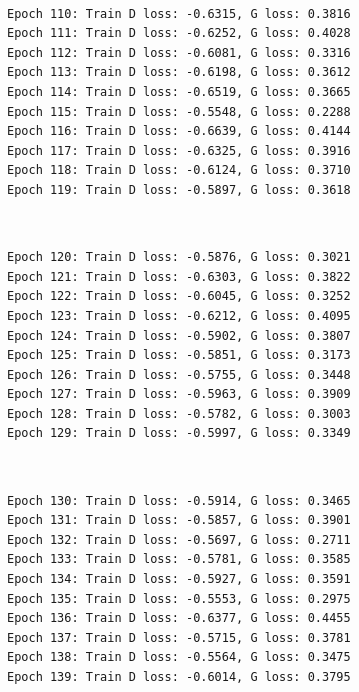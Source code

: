 \documentclass[11pt]{article}
\begin{document}
    \begin{center}
    \end{center}
    { \hspace*{\fill} \\}
    
    \begin{Verbatim}[commandchars=\\\{\}]
Epoch 110: Train D loss: -0.6315, G loss: 0.3816
Epoch 111: Train D loss: -0.6252, G loss: 0.4028
Epoch 112: Train D loss: -0.6081, G loss: 0.3316
Epoch 113: Train D loss: -0.6198, G loss: 0.3612
Epoch 114: Train D loss: -0.6519, G loss: 0.3665
Epoch 115: Train D loss: -0.5548, G loss: 0.2288
Epoch 116: Train D loss: -0.6639, G loss: 0.4144
Epoch 117: Train D loss: -0.6325, G loss: 0.3916
Epoch 118: Train D loss: -0.6124, G loss: 0.3710
Epoch 119: Train D loss: -0.5897, G loss: 0.3618

    \end{Verbatim}

    \begin{center}
    \end{center}
    { \hspace*{\fill} \\}
    
    \begin{Verbatim}[commandchars=\\\{\}]
Epoch 120: Train D loss: -0.5876, G loss: 0.3021
Epoch 121: Train D loss: -0.6303, G loss: 0.3822
Epoch 122: Train D loss: -0.6045, G loss: 0.3252
Epoch 123: Train D loss: -0.6212, G loss: 0.4095
Epoch 124: Train D loss: -0.5902, G loss: 0.3807
Epoch 125: Train D loss: -0.5851, G loss: 0.3173
Epoch 126: Train D loss: -0.5755, G loss: 0.3448
Epoch 127: Train D loss: -0.5963, G loss: 0.3909
Epoch 128: Train D loss: -0.5782, G loss: 0.3003
Epoch 129: Train D loss: -0.5997, G loss: 0.3349

    \end{Verbatim}

    \begin{center}
    \end{center}
    { \hspace*{\fill} \\}
    
    \begin{Verbatim}[commandchars=\\\{\}]
Epoch 130: Train D loss: -0.5914, G loss: 0.3465
Epoch 131: Train D loss: -0.5857, G loss: 0.3901
Epoch 132: Train D loss: -0.5697, G loss: 0.2711
Epoch 133: Train D loss: -0.5781, G loss: 0.3585
Epoch 134: Train D loss: -0.5927, G loss: 0.3591
Epoch 135: Train D loss: -0.5553, G loss: 0.2975
Epoch 136: Train D loss: -0.6377, G loss: 0.4455
Epoch 137: Train D loss: -0.5715, G loss: 0.3781
Epoch 138: Train D loss: -0.5564, G loss: 0.3475
Epoch 139: Train D loss: -0.6014, G loss: 0.3795

    \end{Verbatim}
\end{document}
